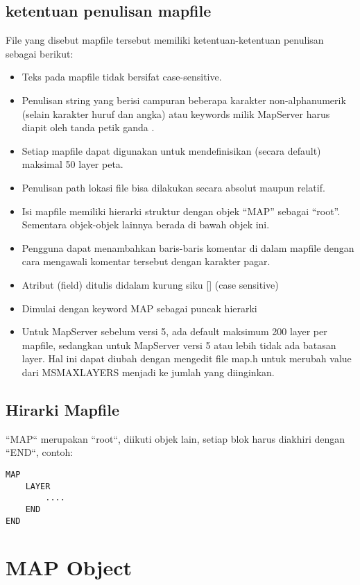 \subsection{ketentuan penulisan mapfile}
File yang disebut mapfile tersebut memiliki ketentuan-ketentuan penulisan sebagai berikut:

\begin{itemize}
	\item Teks pada mapfile tidak bersifat case-sensitive.
	\item Penulisan string yang berisi campuran beberapa karakter non-alphanumerik (selain karakter huruf dan angka) atau keywords milik MapServer harus diapit oleh tanda petik ganda .
	\item Setiap mapfile dapat digunakan untuk mendefinisikan (secara default) maksimal 50 layer peta.
	\item Penulisan path lokasi file bisa dilakukan secara absolut maupun relatif.
	\item Isi mapfile memiliki hierarki struktur dengan objek “MAP” sebagai “root”. Sementara objek-objek lainnya berada di bawah objek ini.
	\item Pengguna dapat menambahkan baris-baris komentar di dalam mapfile dengan cara mengawali komentar tersebut dengan karakter pagar.
	\item Atribut (field) ditulis didalam kurung siku [] (case sensitive)
	\item Dimulai dengan keyword MAP sebagai puncak hierarki
	\item Untuk MapServer sebelum versi 5, ada default maksimum 200 layer per mapfile, 
	      sedangkan untuk MapServer versi 5 atau lebih tidak ada batasan layer. 
              Hal ini dapat diubah dengan mengedit file map.h untuk merubah value dari MSMAXLAYERS menjadi ke jumlah yang diinginkan.	
\end{itemize}

\subsection{Hirarki Mapfile}
``MAP`` merupakan ``root``, diikuti objek lain, setiap blok harus diakhiri dengan ``END``, 
contoh:
\begin{verbatim}
MAP
	LAYER
		....
	END
END
\end{verbatim}


\section{MAP Object}
